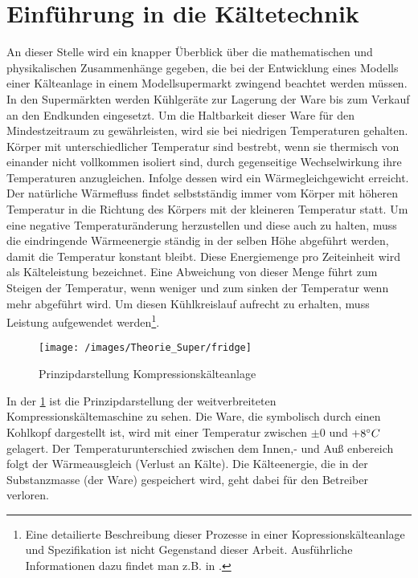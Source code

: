 
\section{Einf\"uhrung in die K\"altetechnik}

An dieser Stelle wird ein knapper \"Uberblick über die mathematischen und
physikalischen Zusammenhänge gegeben, die bei der Entwicklung eines Modells
einer K\"alteanlage in einem Modellsupermarkt zwingend beachtet werden müssen.\\

In den Superm\"arkten werden K\"uhlger\"ate zur Lagerung der Ware bis zum
Verkauf an den Endkunden eingesetzt. Um die Haltbarkeit dieser Ware f\"ur den
Mindestzeitraum zu gew\"ahrleisten, wird sie bei niedrigen Temperaturen
gehalten. Körper mit unterschiedlicher Temperatur sind bestrebt, wenn sie
thermisch von einander nicht vollkommen isoliert sind, durch gegenseitige
Wechselwirkung ihre Temperaturen anzugleichen. Infolge dessen wird ein
Wärmegleichgewicht erreicht. Der nat\"urliche W\"armefluss findet
selbstst\"andig immer vom K\"orper mit h\"oheren Temperatur in die Richtung des
K\"orpers mit der kleineren Temperatur statt. Um eine negative
Temperaturänderung herzustellen und diese auch zu halten, muss die eindringende
Wärmeenergie ständig in der selben Höhe abgeführt werden, damit die Temperatur
konstant bleibt. Diese Energiemenge pro Zeiteinheit wird als Kälteleistung
bezeichnet. Eine Abweichung von dieser Menge führt zum Steigen der Temperatur,
wenn weniger und zum sinken der Temperatur wenn mehr abgeführt wird. Um diesen
Kühlkreislauf aufrecht zu erhalten, muss Leistung aufgewendet werden\footnote{
	Eine detailierte Beschreibung dieser Prozesse in einer
	Kopressionskälteanlage und Spezifikation ist nicht Gegenstand dieser
	Arbeit.  Ausführliche Informationen dazu findet man z.B.  in \cite{caro,
	doctor,
TAB_A1}.}.

\begin{figure}[float=h]\caption{Prinzipdarstellung Kompressionsk\"alteanlage}
\label{prinz}
\begin{center}
\texttt{[image: /images/Theorie\_Super/fridge]}
	\end{center}
\end{figure}

In der \cref{prinz} ist die Prinzipdarstellung der weitverbreiteten
Kompressionsk\"altemaschine zu sehen. Die Ware, die symbolisch durch einen
Kohlkopf dargestellt ist, wird mit einer Temperatur zwischen $\pm 0$ und
$+8^\circ C$ gelagert. Der Temperaturunterschied zwischen dem Innen,- und Au\ss
enbereich folgt der W\"armeausgleich (Verlust an K\"alte). Die K\"alteenergie,
die in der Substanzmasse (der Ware) gespeichert wird, geht dabei f\"ur den
Betreiber verloren.


